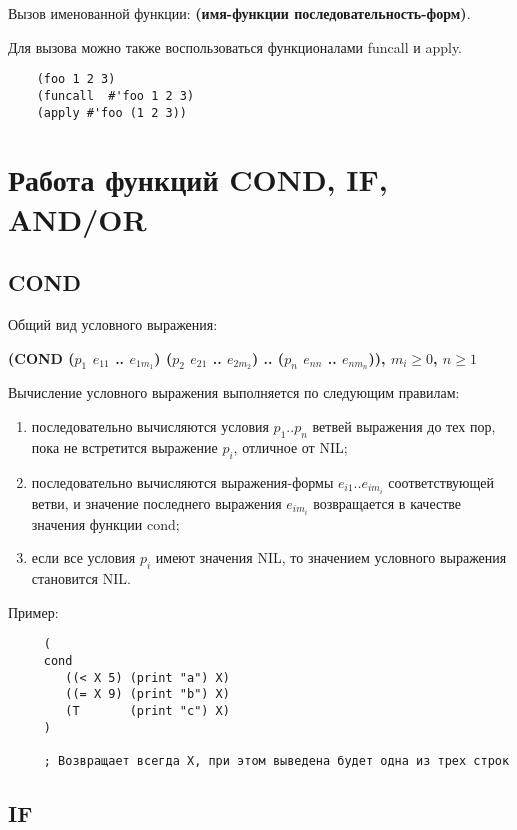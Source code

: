 Вызов именованной функции: \textbf{(имя-функции последовательность-форм)}. 

Для вызова можно также воспользоваться функционалами funcall и apply.

\begin{lstlisting}
    (foo 1 2 3)
    (funcall  #'foo 1 2 3)
    (apply #'foo (1 2 3))
\end{lstlisting}

\section{Работа функций COND, IF, AND/OR}

\subsection{COND}

Общий вид условного выражения:  

\textbf{(COND ($p_1$ $e_{11}$ .. $e_{1m_1}$) ($p_2$ $e_{21}$ .. $e_{2m_2}$) .. ($p_n$ $e_{nn}$ .. $e_{nm_n}$)), $m_i \geq 0$, $n \geq  1$}

Вычисление условного выражения выполняется по следующим правилам:

\begin{enumerate}
    \item последовательно вычисляются условия $p_1 .. p_n$ ветвей выражения до тех пор, пока не встретится выражение $p_i$, отличное от NIL;
    \item последовательно вычисляются выражения-формы $e_{i1} .. e_{im_i}$ соответствующей ветви, и значение последнего выражения $e_{im_i}$ возвращается в качестве значения функции cond;
    \item если все условия $p_i$ имеют значения NIL, то значением условного выражения становится NIL.
\end{enumerate}

Пример:
\begin{lstlisting}
     (
     cond 
        ((< X 5) (print "a") X)
        ((= X 9) (print "b") X)
        (T       (print "c") X)
     )

     ; Возвращает всегда X, при этом выведена будет одна из трех строк
\end{lstlisting}

\newpage

\subsection{IF}

